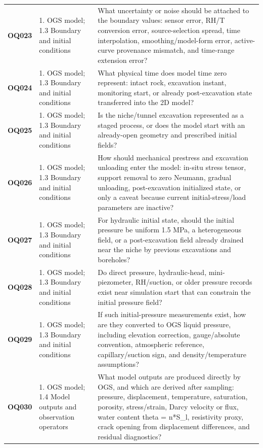 \begin{longtable}{@{}L{0.10\textwidth} L{0.23\textwidth} L{0.59\textwidth}@{}}
\addlinespace[0.16em]
\textbf{OQ023} & 1. OGS model; 1.3 Boundary and initial conditions & What uncertainty or noise should be attached to the boundary values: sensor error, RH/T conversion error, source-selection spread, time interpolation, smoothing/model-form error, active-curve provenance mismatch, and time-range extension error?\\
\addlinespace[0.16em]
\textbf{OQ024} & 1. OGS model; 1.3 Boundary and initial conditions & What physical time does model time zero represent: intact rock, excavation instant, monitoring start, or already post-excavation state transferred into the 2D model?\\
\addlinespace[0.16em]
\textbf{OQ025} & 1. OGS model; 1.3 Boundary and initial conditions & Is the niche/tunnel excavation represented as a staged process, or does the model start with an already-open geometry and prescribed initial fields?\\
\addlinespace[0.16em]
\textbf{OQ026} & 1. OGS model; 1.3 Boundary and initial conditions & How should mechanical prestress and excavation unloading enter the model: in-situ stress tensor, support removal to zero Neumann, gradual unloading, post-excavation initialized state, or only a caveat because current initial-stress/load parameters are inactive?\\
\addlinespace[0.16em]
\textbf{OQ027} & 1. OGS model; 1.3 Boundary and initial conditions & For hydraulic initial state, should the initial pressure be uniform 1.5 MPa, a heterogeneous field, or a post-excavation field already drained near the niche by previous excavations and boreholes?\\
\addlinespace[0.16em]
\textbf{OQ028} & 1. OGS model; 1.3 Boundary and initial conditions & Do direct pressure, hydraulic-head, mini-piezometer, RH/suction, or older pressure records exist near simulation start that can constrain the initial pressure field?\\
\addlinespace[0.16em]
\textbf{OQ029} & 1. OGS model; 1.3 Boundary and initial conditions & If such initial-pressure measurements exist, how are they converted to OGS liquid pressure, including elevation correction, gauge/absolute convention, atmospheric reference, capillary/suction sign, and density/temperature assumptions?\\
\addlinespace[0.16em]
\textbf{OQ030} & 1. OGS model; 1.4 Model outputs and observation operators & What model outputs are produced directly by OGS, and which are derived after sampling: pressure, displacement, temperature, saturation, porosity, stress/strain, Darcy velocity or flux, water content theta = n*S\_l, resistivity proxy, crack opening from displacement differences, and residual diagnostics?\\

\end{longtable}
